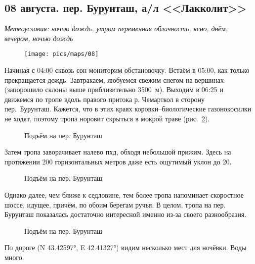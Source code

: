 \subsection{08 августа. пер. Бурунташ, а/л <<Лакколит>>}
\textit{Метеоусловия: ночью дождь, утром переменная облачность, ясно, днём, вечером, ночью дождь}

\begin{figure}[h!]
	\centering
	\texttt{[image: pics/maps/08]}
	\label{fig:08}
\end{figure}

Начиная с 04:00 сквозь сон мониторим обстановочку. Встаём в 05:00, как только прекращается дождь. Завтракаем, любуемся свежим снегом на вершинах (запорошило склоны выше приблизительно 3500~м). Выходим в 06:25 и движемся по тропе вдоль правого притока р. Чемарткол в сторону пер.~Бурунташ. Кажется, что в этих краях коровки--биологические газонокосилки не ходят, поэтому тропа норовит скрыться в мокрой траве (рис.~\ref{fig:burun_river}).

\begin{figure}[h!]
	\centering
	\caption{Подъём на пер. Бурунташ}
	\label{fig:burun_river}
\end{figure}

Затем тропа заворачивает налево пхд, обходя небольшой прижим. Здесь на протяжении 200 горизонтальных метров даже есть ощутимый уклон до 20\degree. 

\begin{figure}[h!]
	\centering
	\caption{Подъём на пер. Бурунташ}
	\label{fig:burun_uphill}
\end{figure}


Однако далее, чем ближе к седловине, тем более тропа напоминает скоростное шоссе, идущее, причём, по обоим берегам ручья. В целом, тропа на пер. Бурунташ показалась достаточно интересной именно из-за своего разнообразия.

\begin{figure}[h!]
	\centering
	\caption{Подъём на пер. Бурунташ}
	\label{fig:burun_uphill_1}
\end{figure}

По дороге (N 43.42597°, E 42.41327°) видим несколько мест для ночёвки. Воды много.


